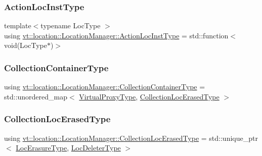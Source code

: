 \subsubsection{\texorpdfstring{Action\+Loc\+Inst\+Type}{ActionLocInstType}}
{\footnotesize\ttfamily template$<$typename Loc\+Type $>$ \\
using \hyperlink{structvt_1_1location_1_1_location_manager_a6de3841092c537efc5fb8376128bfe18}{vt\+::location\+::\+Location\+Manager\+::\+Action\+Loc\+Inst\+Type} =  std\+::function$<$void(Loc\+Type$\ast$)$>$}

\mbox{\label{structvt_1_1location_1_1_location_manager_a03472723aecf57cd99cd221ef2164edb}} 
\subsubsection{\texorpdfstring{Collection\+Container\+Type}{CollectionContainerType}}
{\footnotesize\ttfamily using \hyperlink{structvt_1_1location_1_1_location_manager_a03472723aecf57cd99cd221ef2164edb}{vt\+::location\+::\+Location\+Manager\+::\+Collection\+Container\+Type} =  std\+::unordered\+\_\+map$<$ \hyperlink{namespacevt_a1b417dd5d684f045bb58a0ede70045ac}{Virtual\+Proxy\+Type}, \hyperlink{structvt_1_1location_1_1_location_manager_a590e246bdfa380ef31e7aee4f4d51442}{Collection\+Loc\+Erased\+Type} $>$}

\mbox{\label{structvt_1_1location_1_1_location_manager_a590e246bdfa380ef31e7aee4f4d51442}} 
\subsubsection{\texorpdfstring{Collection\+Loc\+Erased\+Type}{CollectionLocErasedType}}
{\footnotesize\ttfamily using \hyperlink{structvt_1_1location_1_1_location_manager_a590e246bdfa380ef31e7aee4f4d51442}{vt\+::location\+::\+Location\+Manager\+::\+Collection\+Loc\+Erased\+Type} =  std\+::unique\+\_\+ptr$<$ \hyperlink{structvt_1_1location_1_1_location_manager_a0c153c55a8938e99fad5386699653220}{Loc\+Erasure\+Type}, \hyperlink{structvt_1_1location_1_1_location_manager_ab0ce8907fcf9b36cf884af08c744ddb1}{Loc\+Deleter\+Type} $>$}

